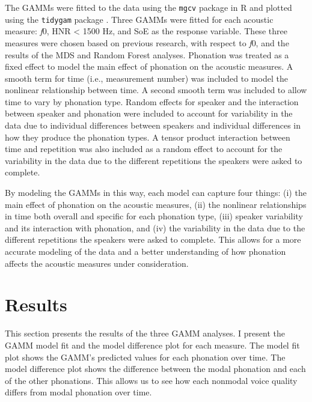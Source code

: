 The GAMMs were fitted to the data using the \texttt{mgcv} package in R \citep{woodGeneralizedAdditiveModels2017} and plotted using the \texttt{tidygam} package \citep{corettaTidygamTidyPrediction2024}. Three GAMMs were fitted for each acoustic measure: \textit{f}0, HNR < 1500 Hz, and SoE as the response variable. These three measures were chosen based on previous research, with respect to \textit{f}0, and the results of the MDS and Random Forest analyses. Phonation was treated as a fixed effect to model the main effect of phonation on the acoustic measures. A smooth term for time (i.e., measurement number)  was included to model the nonlinear relationship between time. A second smooth term was included to allow time to vary by phonation type. Random effects for speaker and the interaction between speaker and phonation were included to account for variability in the data due to individual differences between speakers and individual differences in how they produce the phonation types. A tensor product interaction between time and repetition was also included as a random effect to account for the variability in the data due to the different repetitions the speakers were asked to complete. 

By modeling the GAMMs in this way, each model can capture four things: (i) the main effect of phonation on the acoustic measures, (ii) the nonlinear relationships in time both overall and specific for each phonation type, (iii) speaker variability and its interaction with phonation, and (iv) the variability in the data due to the different repetitions the speakers were asked to complete. This allows for a more accurate modeling of the data and a better understanding of how phonation affects the acoustic measures under consideration. 

\section{Results}\label{sec:results_of_lc}

This section presents the results of the three GAMM analyses. I present the GAMM model fit and the model difference plot for each measure. The model fit plot shows the GAMM's predicted values for each phonation over time. The model difference plot shows the difference between the modal phonation and each of the other phonations. This allows us to see how each nonmodal voice quality differs from modal phonation over time.

